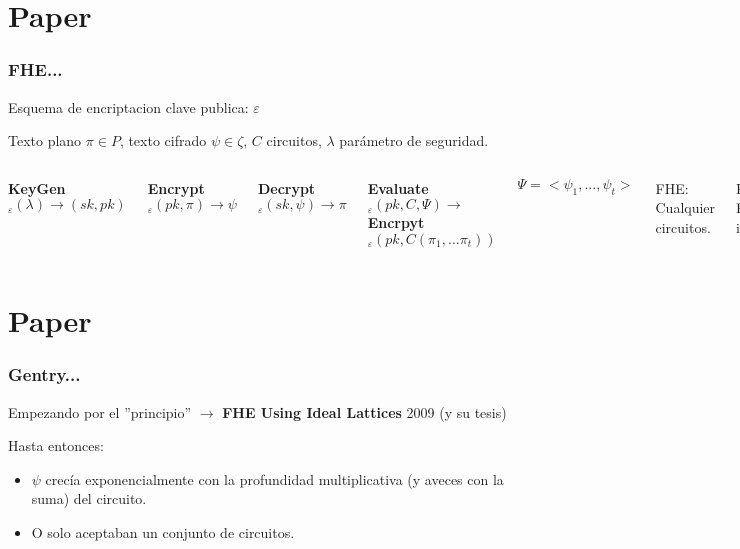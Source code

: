 \documentclass[10pt]{beamer}
\begin{document}
\section{Paper}
\begin{frame}
\frametitle{FHE...}
  Esquema de encriptacion clave publica: $\varepsilon$

  Texto plano $\pi \in P$, texto cifrado $\psi \in \zeta$, $C$ circuitos, $\lambda$ parámetro de seguridad.
  \vspace{0.3cm}

\begin{columns}
     \textbf{KeyGen}$_\varepsilon(\lambda) \rightarrow (sk,pk)$

  \vspace{0.3cm}
  \textbf{Encrypt}$_\varepsilon(pk, \pi) \rightarrow \psi$

  \vspace{0.3cm}
  \textbf{Decrypt}$_\varepsilon(sk, \psi) \rightarrow \pi$

  \vspace{0.3cm}
  \textbf{Evaluate}$_\varepsilon(pk, C, \Psi) \rightarrow$ \textbf{Encrpyt}$_\varepsilon(pk, C(\pi_1,...\pi_t))$

  \vspace{0.3cm}
  $\Psi = <\psi_1,...,\psi_t>$

      FHE: Cualquier circuitos.

  \vspace{0.3cm}
  Privacidad:  Estadísticamente indistinguibles
  \vspace{0.3cm}

  \textbf{Encrpyt}$_\varepsilon(pk, C(\pi_1,...\pi_t)) \approx  \textbf{Evaluate}_\varepsilon(pk, C, \Psi)$


\end{columns}

\end{frame}
\section{Paper}
\begin{frame}
\frametitle{Gentry...}

  Empezando por el ''principio''  $\rightarrow$ \textbf{FHE Using Ideal Lattices} 2009 (y su tesis)

  Hasta entonces:
  \begin{itemize}
    \item  $\psi$ crecía exponencialmente con la profundidad multiplicativa (y aveces con la suma) del circuito.
    \item O solo aceptaban un conjunto de circuitos.
  \end{itemize}
\end{frame}
\end{document}
